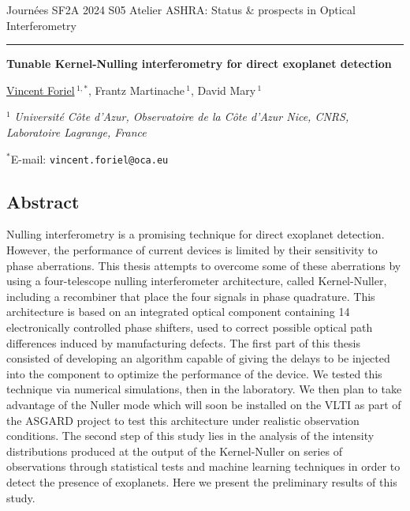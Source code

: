 \documentclass[12pt]{article}
\begin{document}
Journées SF2A 2024
\hfill
S05 Atelier ASHRA: Status \& prospects in Optical Interferometry

\smallskip
\hrule

\bigskip

\begin{center}
\LARGE \bf Tunable Kernel-Nulling interferometry for direct exoplanet detection\rm

\vspace{0.5cm}

\large  \underline{Vincent Foriel}$\,^{1,*}$, \large Frantz Martinache$\,^1$, \large David Mary$\,^1$

\vspace{0.5cm}

\normalsize

$^1$ \textit{Université Côte d’Azur, Observatoire de la Côte d’Azur Nice, CNRS, Laboratoire Lagrange, France}

\vspace{0.3cm}
$^*$E-mail: {\tt vincent.foriel@oca.eu}

\end{center}
\vspace{-0.8cm}
\subsection*{\Large Abstract}

Nulling interferometry is a promising technique for direct exoplanet detection. However, the performance of current devices is limited by their sensitivity to phase aberrations. This thesis attempts to overcome some of these aberrations by using a four-telescope nulling interferometer architecture, called Kernel-Nuller\cite{Martinache et al. 2018}, including a recombiner that place the four signals in phase quadrature. This architecture is based on an integrated optical component containing 14 electronically controlled phase shifters, used to correct possible optical path differences induced by manufacturing defects. The first part of this thesis consisted of developing an algorithm capable of giving the delays to be injected into the component to optimize the performance of the device. We tested this technique via numerical simulations, then in the laboratory. We then plan to take advantage of the Nuller mode which will soon be installed on the VLTI as part of the ASGARD project to test this architecture under realistic observation conditions. The second step of this study lies in the analysis of the intensity distributions produced at the output of the Kernel-Nuller\cite{Martinache et al. 2018, Cvetojevic et al. 2022} on series of observations through statistical tests and machine learning techniques in order to detect the presence of exoplanets. Here we present the preliminary results of this study.
\end{document}
